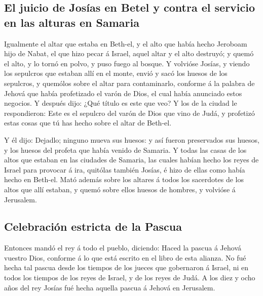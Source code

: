 \hypertarget{el-juicio-de-josuxedas-en-betel-y-contra-el-servicio-en-las-alturas-en-samaria}{%
\subsection{El juicio de Josías en Betel y contra el servicio en las
alturas en
Samaria}\label{el-juicio-de-josuxedas-en-betel-y-contra-el-servicio-en-las-alturas-en-samaria}}

 Igualmente el altar que estaba en Beth-el, y el alto que
había hecho Jeroboam hijo de Nabat, el que hizo pecar á Israel, aquel
altar y el alto destruyó; y quemó el alto, y lo tornó en polvo, y puso
fuego al bosque.  Y volvióse Josías, y viendo los
sepulcros que estaban allí en el monte, envió y sacó los huesos de los
sepulcros, y quemólos sobre el altar para contaminarlo, conforme á la
palabra de Jehová que había profetizado el varón de Dios, el cual había
anunciado estos negocios.  Y después dijo: ¿Qué título es
este que veo? Y los de la ciudad le respondieron: Este es el sepulcro
del varón de Dios que vino de Judá, y profetizó estas cosas que tú has
hecho sobre el altar de Beth-el.

 Y él dijo: Dejadlo; ninguno mueva sus huesos: y así
fueron preservados sus huesos, y los huesos del profeta que había venido
de Samaria.  Y todas las casas de los altos que estaban
en las ciudades de Samaria, las cuales habían hecho los reyes de Israel
para provocar á ira, quitólas también Josías, é hizo de ellas como había
hecho en Beth-el.  Mató además sobre los altares á todos
los sacerdotes de los altos que allí estaban, y quemó sobre ellos huesos
de hombres, y volvióse á Jerusalem.

\hypertarget{celebraciuxf3n-estricta-de-la-pascua}{%
\subsection{Celebración estricta de la
Pascua}\label{celebraciuxf3n-estricta-de-la-pascua}}

 Entonces mandó el rey á todo el pueblo, diciendo: Haced
la pascua á Jehová vuestro Dios, conforme á lo que está escrito en el
libro de esta alianza.  No fué hecha tal pascua desde los
tiempos de los jueces que gobernaron á Israel, ni en todos los tiempos
de los reyes de Israel, y de los reyes de Judá.  A los
diez y ocho años del rey Josías fué hecha aquella pascua á Jehová en
Jerusalem.

